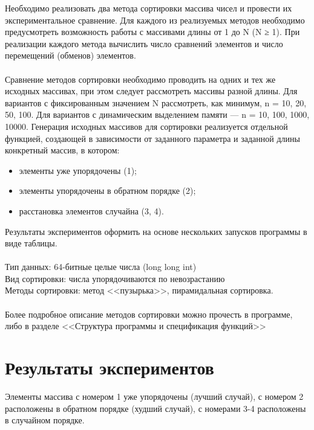 \documentclass[a4paper,12pt,titlepage,finall]{article}
\begin{document}
Необходимо реализовать два метода сортировки массива чисел и провести их экспериментальное сравнение. Для каждого из
реализуемых методов необходимо предусмотреть возможность работы с массивами длины от 1 до N (N ≥ 1).
При реализации каждого метода вычислить число сравнений элементов и число перемещений (обменов) элементов.\\
~\\
Сравнение методов сортировки необходимо проводить на одних и тех же исходных массивах, при этом
следует рассмотреть массивы разной длины. Для вариантов с фиксированным значением N рассмотреть, как
минимум, n = 10, 20, 50, 100. Для вариантов с динамическим выделением памяти — n = 10, 100, 1000, 10000.
Генерация исходных массивов для сортировки реализуется отдельной функцией, создающей в зависимости от
заданного параметра и заданной длины конкретный массив, в котором:
\begin{itemize}
\item элементы уже упорядочены (1);
\item элементы упорядочены в обратном порядке (2);
\item расстановка элементов случайна (3, 4).
\end{itemize}
Результаты экспериментов оформить на основе нескольких запусков программы в виде таблицы.\\
~\\
Тип данных: 64-битные целые числа (long long int)\\
Вид сортировки: числа упорядочиваются по невозрастанию\\
Методы сортировки: метод <<пузырька>>, пирамидальная сортировка.\\
~\\
Более подробное описание методов сортировки можно прочесть в программе, либо в разделе <<Структура программы и спецификация функций>>\\

\newpage

\section{Результаты экспериментов}

Элементы массива с номером 1 уже упорядочены (лучший случай), с номером 2 расположены в обратном порядке (худший случай), с номерами 3-4 расположены в случайном порядке.
\end{document}
